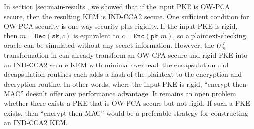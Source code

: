 \documentclass[floatrow,journal=tches,submission]{iacrtrans}
\newcommand{\encrypt}{\texttt{Enc}}
\newcommand{\decrypt}{\texttt{Dec}}
\newcommand{\pk}{\texttt{pk}}
\newcommand{\sk}{\texttt{sk}}
\begin{document}
In section \ref{sec:main-results}, we showed that if the input PKE is OW-PCA secure, then the resulting KEM is IND-CCA2 secure. One sufficient condition for OW-PCA security is one-way security plus rigidity. If the input PKE is rigid, then $m = \decrypt(\sk, c)$ is equivalent to $c = \encrypt(\pk, m)$, so a plaintext-checking oracle can be simulated without any secret information. However, the $U_m^{\not\bot}$ transformation in \cite{hofheinz2017modular} can already transform an OW-CPA secure and rigid PKE into an IND-CCA2 secure KEM with minimal overhead: the encapsulation and decapsulation routines each adds a hash of the plaintext to the encryption and decryption routine. In other words, where the input PKE is rigid, ``encrypt-then-MAC'' doesn't offer any performance advantage. It remains an open problem whether there exists a PKE that is OW-PCA secure but not rigid. If such a PKE exists, then ``encrypt-then-MAC'' would be a preferable strategy for constructing an IND-CCA2 KEM.





\end{document}
